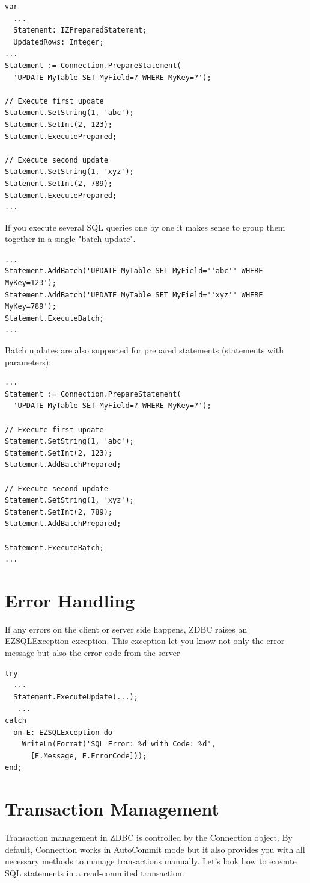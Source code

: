 \documentclass[a4paper,12pt,oneside]{book}
\begin{document}
\begin{verbatim}
var
  ...
  Statement: IZPreparedStatement;
  UpdatedRows: Integer;
...
Statement := Connection.PrepareStatement(
  'UPDATE MyTable SET MyField=? WHERE MyKey=?');

// Execute first update
Statement.SetString(1, 'abc');
Statement.SetInt(2, 123);
Statement.ExecutePrepared;

// Execute second update
Statement.SetString(1, 'xyz');
Statenent.SetInt(2, 789);
Statement.ExecutePrepared;
...
\end{verbatim}

If you execute several SQL queries one by one it makes sense to group them together in a single "batch update". 

\begin{verbatim}
...
Statement.AddBatch('UPDATE MyTable SET MyField=''abc'' WHERE MyKey=123');
Statement.AddBatch('UPDATE MyTable SET MyField=''xyz'' WHERE MyKey=789');
Statement.ExecuteBatch;
...
\end{verbatim}

Batch updates are also supported for prepared statements (statements with parameters): 

\begin{verbatim}
...
Statement := Connection.PrepareStatement(
  'UPDATE MyTable SET MyField=? WHERE MyKey=?');

// Execute first update
Statement.SetString(1, 'abc');
Statement.SetInt(2, 123);
Statement.AddBatchPrepared;

// Execute second update
Statement.SetString(1, 'xyz');
Statenent.SetInt(2, 789);
Statement.AddBatchPrepared;

Statement.ExecuteBatch;
...
\end{verbatim}

\section{Error Handling}
If any errors on the client or server side happens, ZDBC raises an EZSQLException exception.
This exception let you know not only the error message but also the error code from the server

\begin{verbatim}
try
  ...
  Statement.ExecuteUpdate(...);
   ...
catch
  on E: EZSQLException do
    WriteLn(Format('SQL Error: %d with Code: %d',
      [E.Message, E.ErrorCode]));
end;
\end{verbatim}

\section{Transaction Management}
Transaction management in ZDBC is controlled by the Connection object.
By default, Connection works in AutoCommit mode but it also provides you with all necessary methods to manage transactions manually.
Let's look how to execute SQL statements in a read-commited transaction:
\end{document}
